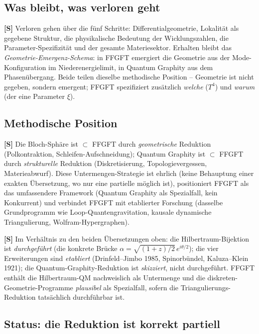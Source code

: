 \subsection*{Was bleibt, was verloren geht}

\textbf{[S]} Verloren gehen über die fünf Schritte: Differentialgeometrie,
Lokalität als gegebene Struktur, die physikalische Bedeutung der Wicklungszahlen,
die Parameter-Spezifizität und der gesamte Materiesektor. Erhalten bleibt das
\emph{Geometrie-Emergenz-Schema}: in FFGFT emergiert die Geometrie aus der
Mode-Konfiguration im Niederenergielimit, in Quantum Graphity aus dem
Phasenübergang. Beide teilen dieselbe methodische Position -- Geometrie ist nicht
gegeben, sondern emergent; FFGFT spezifiziert zusätzlich \emph{welche} ($T^4$) und
\emph{warum} (der eine Parameter $\xi$).

\subsection*{Methodische Position}

\textbf{[S]} Die Bloch-Sphäre ist $\subset$ FFGFT durch \emph{geometrische}
Reduktion (Polkontraktion, Schleifen-Aufschneidung); Quantum Graphity ist
$\subset$ FFGFT durch \emph{strukturelle} Reduktion (Diskretisierung,
Topologievergessen, Materieabwurf). Diese Untermengen-Strategie ist ehrlich (keine
Behauptung einer exakten Übersetzung, wo nur eine partielle möglich ist),
positioniert FFGFT als das umfassendere Framework (Quantum Graphity als
Spezialfall, kein Konkurrent) und verbindet FFGFT mit etablierter Forschung
(dasselbe Grundprogramm wie Loop-Quantengravitation, kausale dynamische
Triangulierung, Wolfram-Hypergraphen).

\textbf{[S]} Im Verhältnis zu den beiden Übersetzungen oben: die
Hilbertraum-Bijektion ist \emph{durchgeführt} (die konkrete Brücke
$\alpha=\sqrt{(1+z)/2}\,e^{i\theta/2}$); die vier Erweiterungen sind
\emph{etabliert} (Drinfeld--Jimbo 1985, Spinorbündel, Kaluza--Klein 1921); die
Quantum-Graphity-Reduktion ist \emph{skizziert}, nicht durchgeführt. FFGFT
enthält die Hilbertraum-QM nachweislich als Untermenge und die
diskreten-Geometrie-Programme \emph{plausibel} als Spezialfall, sofern die
Triangulierungs-Reduktion tatsächlich durchführbar ist.

\subsection*{Status: die Reduktion ist korrekt partiell}

